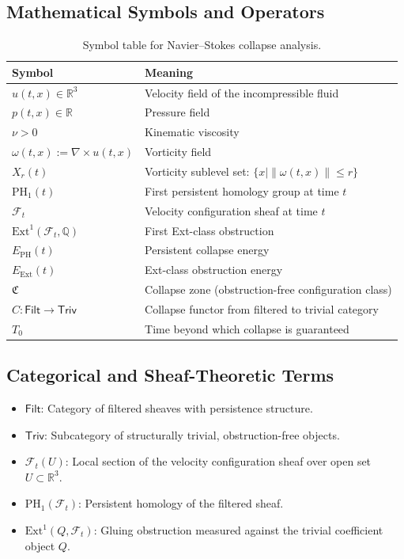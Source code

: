 \documentclass[11pt]{article}
\begin{document}
\subsection*{Mathematical Symbols and Operators}

\begin{table}[H]
\centering
\renewcommand{\arraystretch}{1.3}
\begin{tabular}{@{}ll@{}}  %
\toprule
\textbf{Symbol} & \textbf{Meaning} \\
\midrule
$u(t,x) \in \mathbb{R}^3$ & Velocity field of the incompressible fluid \\
$p(t,x) \in \mathbb{R}$ & Pressure field \\
$\nu > 0$ & Kinematic viscosity \\
$\omega(t,x) := \nabla \times u(t,x)$ & Vorticity field \\
$X_r(t)$ & Vorticity sublevel set: $\{ x \mid \|\omega(t,x)\| \leq r \}$ \\
$\mathrm{PH}_1(t)$ & First persistent homology group at time $t$ \\
$\mathcal{F}_t$ & Velocity configuration sheaf at time $t$ \\
$\mathrm{Ext}^1(\mathcal{F}_t, \mathbb{Q})$ & First Ext-class obstruction \\
$E_{\mathrm{PH}}(t)$ & Persistent collapse energy \\
$E_{\mathrm{Ext}}(t)$ & Ext-class obstruction energy \\
$\mathfrak{C}$ & Collapse zone (obstruction-free configuration class) \\
$C : \mathsf{Filt} \to \mathsf{Triv}$ & Collapse functor from filtered to trivial category \\
$T_0$ & Time beyond which collapse is guaranteed \\
\bottomrule
\end{tabular}
\caption{Symbol table for Navier–Stokes collapse analysis.}
\end{table}


\subsection*{Categorical and Sheaf-Theoretic Terms}

\begin{itemize}
  \item $\mathsf{Filt}$: Category of filtered sheaves with persistence structure.
  \item $\mathsf{Triv}$: Subcategory of structurally trivial, obstruction-free objects.
  \item $\mathcal{F}_t(U)$: Local section of the velocity configuration sheaf over open set $U \subset \mathbb{R}^3$.
  \item $\mathrm{PH}_1(\mathcal{F}_t)$: Persistent homology of the filtered sheaf.
  \item $\mathrm{Ext}^1(Q, \mathcal{F}_t)$: Gluing obstruction measured against the trivial coefficient object $Q$.
\end{itemize}
\end{document}

